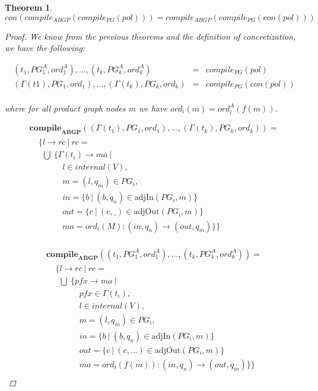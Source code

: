 \documentclass[twocolumn]{sig-alternate-10pt}
\newtheorem{thm}{Theorem}[section]
\begin{document}
\begin{thm}
  $con(compile_{ABGP}(compile_{PG}(pol))) = compile_{ABGP}(compile_{PG}(con(pol)))$

  \begin{proof}

    We know from the previous theorems and the definition of concretization, we have the following:

    \[ \begin{array}{lll}
       (t_1, PG^A_1, ord^A_1), \dots, (t_k,PG^A_k,ord^A_k)    &=& compile_{PG}(pol) \\
       (\Gamma(t1), PG_1, ord_1), \dots, (\Gamma(t_k),PG_k,ord_k)  &=& compile_{PG}(con(pol)) \\
    \end{array} \]%

    where for all product graph nodes $m$ we have $ord_i(m) = ord^A_i(f(m))$.


  \[ \begin{array}{l}
     \textbf{compile}_\textbf{ABGP}( (\Gamma(t_1),PG_1,ord_1), \dots, (\Gamma(t_k),PG_k,ord_k) ) = \\
     ~~~~~ \{ l \rightarrow rc ~\vert~ rc = \\
     ~~~~~~~ \bigcup~ \{ \Gamma(t_i) \rightarrow ma ~\vert~ \\
     ~~~~~~~~~~~~~~~~~~ l \in internal(V), \\
     ~~~~~~~~~~~~~~~~~~ m = (l,q_m) \in PG_i, \\
     ~~~~~~~~~~~~~~~~~~ in = \{ b ~\vert~ (b,q_n) \in \text{adjIn}(PG_i,m) \} \\
     ~~~~~~~~~~~~~~~~~~ out = \{ c ~\vert~ (c,\_) \in \text{adjOut}(PG_i,m) \} \\
     ~~~~~~~~~~~~~~~~~~ ma = ord_i(M) : (in,q_n) \rightarrow (out,q_m) \} \} \\
  \end{array} \]%

  \[ \begin{array}{l}
     \textbf{compile}_\textbf{ABGP}( (t_1,PG^A_1,ord^A_1), \dots, (t_k,PG^A_k,ord^A_k) ) = \\
     ~~~~~ \{ l \rightarrow rc ~\vert~ rc = \\
     ~~~~~~~ \bigcup~ \{ pfx \rightarrow ma ~\vert~ \\
     ~~~~~~~~~~~~~~~~~~ pfx \in \Gamma(t_i), \\
     ~~~~~~~~~~~~~~~~~~ l \in internal(V), \\
     ~~~~~~~~~~~~~~~~~~ m = (l,q_m) \in PG_i, \\
     ~~~~~~~~~~~~~~~~~~ in = \{ b ~\vert~ (b,q_n) \in \text{adjIn}(PG_i,m) \} \\
     ~~~~~~~~~~~~~~~~~~ out = \{ c ~\vert~ (c,\dots) \in \text{adjOut}(PG_i,m) \} \\ 
     ~~~~~~~~~~~~~~~~~~ ma = ord_i(f(m)) : (in,q_n) \rightarrow (out,q_m) \} \} \\
  \end{array} \]%


\end{proof}
\end{thm}
\end{document}
